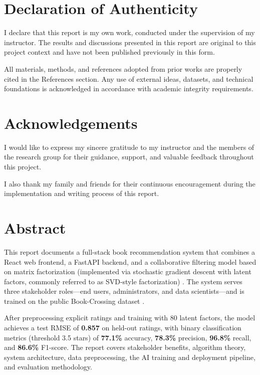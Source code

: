 \documentclass[12pt,a4paper]{report}
\begin{document}
\clearpage
{}

\chapter*{Declaration of Authenticity}
I declare that this report is my own work, conducted under the supervision of my instructor. The results and discussions presented in this report are original to this project context and have not been published previously in this form.

All materials, methods, and references adopted from prior works are properly cited in the References section. Any use of external ideas, datasets, and technical foundations is acknowledged in accordance with academic integrity requirements.

\clearpage
\chapter*{Acknowledgements}
I would like to express my sincere gratitude to my instructor and the members of the research group for their guidance, support, and valuable feedback throughout this project.

I also thank my family and friends for their continuous encouragement during the implementation and writing process of this report.

\clearpage
\chapter*{Abstract}
This report documents a full-stack book recommendation system that combines a React web frontend, a FastAPI backend, and a collaborative filtering model based on matrix factorization (implemented via stochastic gradient descent with latent factors, commonly referred to as SVD-style factorization) \cite{react,fastapi,matrix_factorization}. The system serves three stakeholder roles---end users, administrators, and data scientists---and is trained on the public Book-Crossing dataset \cite{bookcrossing}.

After preprocessing explicit ratings and training with 80 latent factors, the model achieves a test RMSE of \textbf{0.857} on held-out ratings, with binary classification metrics (threshold 3.5 stars) of \textbf{77.1\%} accuracy, \textbf{78.3\%} precision, \textbf{96.8\%} recall, and \textbf{86.6\%} F1-score. The report covers stakeholder benefits, algorithm theory, system architecture, data preprocessing, the AI training and deployment pipeline, and evaluation methodology.
\end{document}
